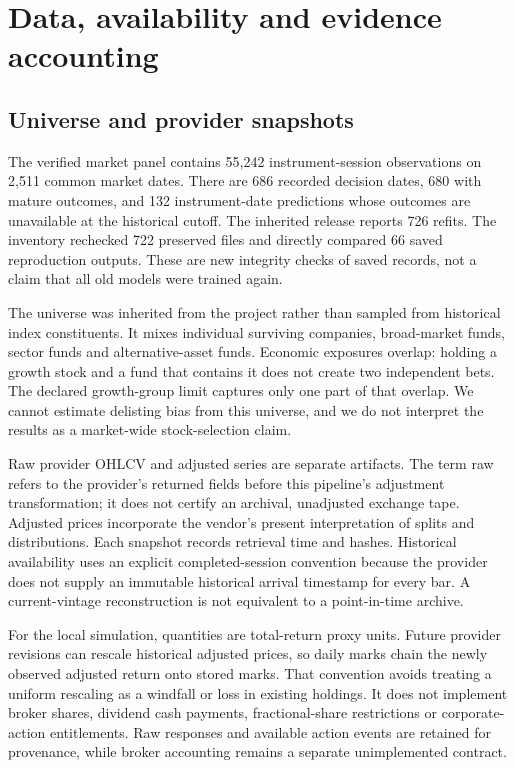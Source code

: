 \documentclass[11pt,a4paper]{article}
\begin{document}

\section{Data, availability and evidence accounting}\label{sec:section-03}

\subsection{Universe and provider snapshots}

The verified market panel contains 55,242 instrument-session observations on 2,511 common market dates. There are 686 recorded decision dates, 680 with mature outcomes, and 132 instrument-date predictions whose outcomes are unavailable at the historical cutoff. The inherited release reports 726 refits. The inventory rechecked 722 preserved files and directly compared 66 saved reproduction outputs. These are new integrity checks of saved records, not a claim that all old models were trained again.

The universe was inherited from the project rather than sampled from historical index constituents. It mixes individual surviving companies, broad-market funds, sector funds and alternative-asset funds. Economic exposures overlap: holding a growth stock and a fund that contains it does not create two independent bets. The declared growth-group limit captures only one part of that overlap. We cannot estimate delisting bias from this universe, and we do not interpret the results as a market-wide stock-selection claim.

Raw provider OHLCV and adjusted series are separate artifacts. The term raw refers to the provider's returned fields before this pipeline's adjustment transformation; it does not certify an archival, unadjusted exchange tape. Adjusted prices incorporate the vendor's present interpretation of splits and distributions. Each snapshot records retrieval time and hashes. Historical availability uses an explicit completed-session convention because the provider does not supply an immutable historical arrival timestamp for every bar. A current-vintage reconstruction is not equivalent to a point-in-time archive.

For the local simulation, quantities are total-return proxy units. Future provider revisions can rescale historical adjusted prices, so daily marks chain the newly observed adjusted return onto stored marks. That convention avoids treating a uniform rescaling as a windfall or loss in existing holdings. It does not implement broker shares, dividend cash payments, fractional-share restrictions or corporate-action entitlements. Raw responses and available action events are retained for provenance, while broker accounting remains a separate unimplemented contract.
\end{document}

